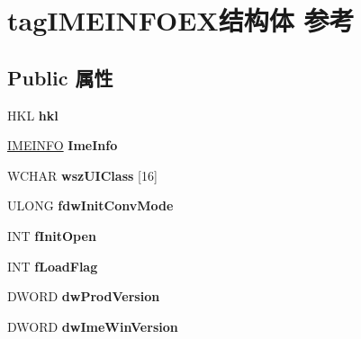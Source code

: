 \hypertarget{structtag_i_m_e_i_n_f_o_e_x}{}\section{tag\+I\+M\+E\+I\+N\+F\+O\+E\+X结构体 参考}
\label{structtag_i_m_e_i_n_f_o_e_x}
\subsection*{Public 属性}
\begin{DoxyCompactItemize}
\item 
\mbox{\label{structtag_i_m_e_i_n_f_o_e_x_ab4d33e3385e3a9b99c7ca6659dac2381}} 
H\+KL {\bfseries hkl}
\item 
\mbox{\label{structtag_i_m_e_i_n_f_o_e_x_a7fabc34242036019ff26ecce92f59673}} 
\hyperlink{struct__tag_i_m_e_i_n_f_o}{I\+M\+E\+I\+N\+FO} {\bfseries Ime\+Info}
\item 
\mbox{\label{structtag_i_m_e_i_n_f_o_e_x_adcf0000bf34996c7a1d932c7aaee7b63}} 
W\+C\+H\+AR {\bfseries wsz\+U\+I\+Class} \mbox{[}16\mbox{]}
\item 
\mbox{\label{structtag_i_m_e_i_n_f_o_e_x_af783e80a66bfef33a89c06cfaf82c15f}} 
U\+L\+O\+NG {\bfseries fdw\+Init\+Conv\+Mode}
\item 
\mbox{\label{structtag_i_m_e_i_n_f_o_e_x_ad84933f2edae47f41010bb3025d5c346}} 
I\+NT {\bfseries f\+Init\+Open}
\item 
\mbox{\label{structtag_i_m_e_i_n_f_o_e_x_a31db1c6de0ecb617d5ba1fa2cd0707d1}} 
I\+NT {\bfseries f\+Load\+Flag}
\item 
\mbox{\label{structtag_i_m_e_i_n_f_o_e_x_a1402ea7d116d3381764a25bf790c4791}} 
D\+W\+O\+RD {\bfseries dw\+Prod\+Version}
\item 
\mbox{\label{structtag_i_m_e_i_n_f_o_e_x_ae669a928a0dbcc1f91de5065acd4d1d7}} 
D\+W\+O\+RD {\bfseries dw\+Ime\+Win\+Version}
\item 

\end{DoxyCompactItemize}
